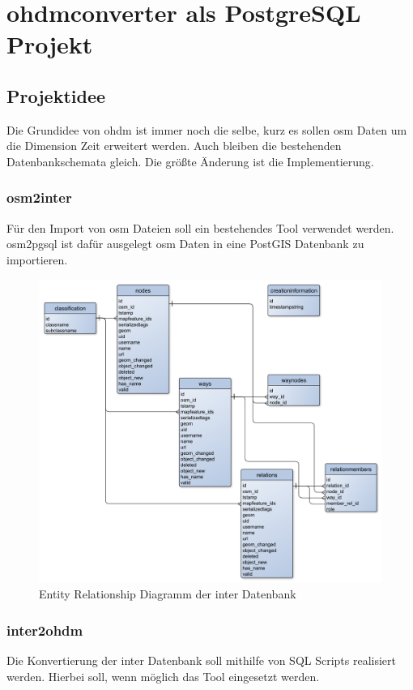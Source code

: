 \part{\gls{ohdmconverter} als PostgreSQL Projekt}
\chapter{Projektidee}
Die Grundidee von \gls{ohdm} ist immer noch die selbe, kurz es sollen \gls{osm} Daten um die Dimension Zeit erweitert werden. Auch bleiben die bestehenden Datenbankschemata gleich. Die größte Änderung ist die Implementierung.

\section{osm2inter}
Für den Import von \gls{osm} Dateien soll ein bestehendes Tool \cite{osm2pgsql} verwendet werden. \gls{osm2pgsql}\cite{osm2pgsql} ist dafür ausgelegt \gls{osm} Daten in eine PostGIS Datenbank zu importieren.

\begin{figure}[h]
	\caption{Entity Relationship Diagramm der \gls{inter} Datenbank}
	\label{fig:erd-inter}
	\includegraphics[width=\linewidth]{img/intermediate-db-erd.pdf}
\end{figure}

\newpage
\section{inter2ohdm}
Die Konvertierung der \gls{inter} Datenbank soll mithilfe von SQL Scripts realisiert werden. Hierbei soll, wenn möglich das Tool \cite{postgres-psql} eingesetzt werden.

